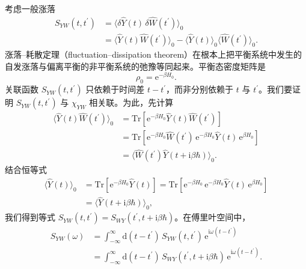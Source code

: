 考虑一般涨落
\begin{equation*}
\begin{aligned}
S_{YW}(t,t^{\prime})&=\langle\delta\widehat{Y}(t)\,\delta\widehat{W}(t^{\prime})\rangle_0\\
&=\langle\widehat{Y}(t)\widehat{W}(t^{\prime})\rangle_0-\langle\widehat{Y}(t)\rangle_0\langle\widehat{W}(t^{\prime})\rangle_0.
\end{aligned}\tag{9.54}
\end{equation*}
涨落–耗散定理（fluctuation–dissipation theorem）在根本上把平衡系统中发生的自发涨落与偏离平衡的非平衡系统的弛豫等同起来。平衡态密度矩阵是
\begin{equation*}
\rho_0=\mathrm{e}^{-\beta H_0}.\tag{9.55}
\end{equation*}
关联函数 $S_{YW}(t,t^{\prime})$ 只依赖于时间差 $t-t^{\prime}$，而非分别依赖于 $t$ 与 $t^{\prime}$。我们要证明 $S_{YW}(t,t^{\prime})$ 与 $\chi_{YW}$ 相关联。为此，先计算
\begin{equation*}
\begin{aligned}
\langle\widehat{Y}(t)\widehat{W}(t^{\prime})\rangle_0&=\mathrm{Tr}[\mathrm{e}^{-\beta H_0}\widehat{Y}(t)\widehat{W}(t^{\prime})]\\
&=\mathrm{Tr}[\mathrm{e}^{-\beta H_0}\widehat{W}(t^{\prime})\,\mathrm{e}^{-\beta H_0}\widehat{Y}(t)\,\mathrm{e}^{\beta H_0}]\\
&=\langle\widehat{W}(t^{\prime})\widehat{Y}(t+\mathrm{i}\beta\hbar)\rangle_0.
\end{aligned}\tag{9.56}
\end{equation*}
结合恒等式
\begin{equation*}
\begin{aligned}
\langle\widehat{Y}(t)\rangle_0&=\mathrm{Tr}[\mathrm{e}^{-\beta H_0}\widehat{Y}(t)]=\mathrm{Tr}[\mathrm{e}^{-\beta H_0}\,\mathrm{e}^{-\beta H_0}\widehat{Y}(t)\,\mathrm{e}^{\beta H_0}]\\
&=\langle\widehat{Y}(t+\mathrm{i}\beta\hbar)\rangle_0,
\end{aligned}\tag{9.57}
\end{equation*}
我们得到等式 $S_{YW}(t,t^{\prime})=S_{WY}(t^{\prime},t+\mathrm{i}\beta\hbar)$。在傅里叶空间中，
\begin{equation*}
\begin{aligned}
S_{YW}(\omega)&=\int_{-\infty}^{\infty}\mathrm{d}(t-t^{\prime})\,S_{YW}(t,t^{\prime})\,\mathrm{e}^{\mathrm{i}\omega(t-t^{\prime})}\\
&=\int_{-\infty}^{\infty}\mathrm{d}(t-t^{\prime})\,S_{WY}(t^{\prime},t+\mathrm{i}\beta\hbar)\,\mathrm{e}^{\mathrm{i}\omega(t-t^{\prime})}.
\end{aligned}\tag{9.58}
\end{equation*}

